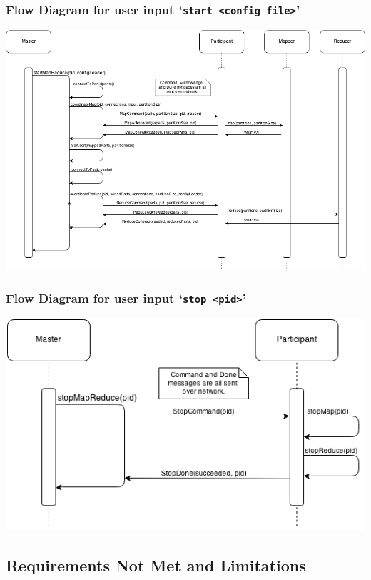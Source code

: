 \documentclass[12pt]{article}
\newcommand{\ttt}{\texttt}
\begin{document}
\subsubsection{Flow Diagram for user input `\ttt{start <config file>}'}
\includegraphics[scale=.5]{MapReduce_start.png}

\subsubsection{Flow Diagram for user input `\ttt{stop <pid>}'}
\includegraphics[scale=.7]{MapReduce_stop.png}

\subsection{Requirements Not Met and Limitations}
\end{document}
